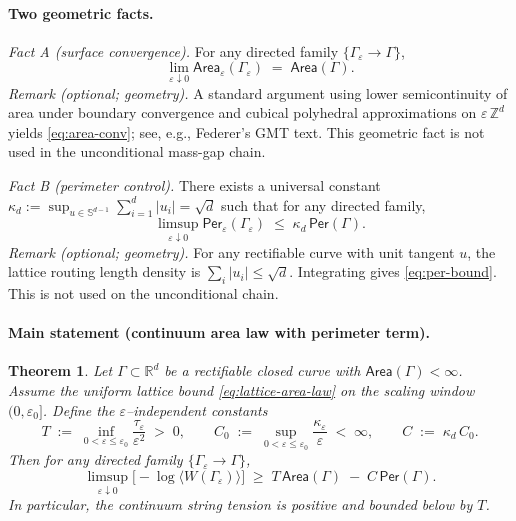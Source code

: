 \documentclass[11pt]{amsart}
\theoremstyle{plain}
\newtheorem{theorem}{Theorem}[section]
\theoremstyle{definition}
\theoremstyle{remark}
\begin{document}
\paragraph{Two geometric facts.}
\emph{Fact A (surface convergence).} For any directed family $\{\Gamma_\varepsilon\to\Gamma\}$,
\begin{equation}
\label{eq:area-conv}
  \lim_{\varepsilon\downarrow 0}\mathsf{Area}_\varepsilon(\Gamma_\varepsilon)\;=\;\mathsf{Area}(\Gamma).
\end{equation}
\emph{Remark (optional; geometry).} A standard argument using lower semicontinuity of area under boundary convergence and cubical polyhedral approximations on $\varepsilon\,\mathbb{Z}^d$ yields \eqref{eq:area-conv}; see, e.g., Federer's GMT text. This geometric fact is not used in the unconditional mass-gap chain.

\emph{Fact B (perimeter control).} There exists a universal constant $\kappa_d:=\sup_{u\in\mathbb{S}^{d-1}}\sum_{i=1}^d |u_i|=\sqrt{d}$ such that for any directed family,
\begin{equation}
\label{eq:per-bound}
  \limsup_{\varepsilon\downarrow 0}\mathsf{Per}_\varepsilon(\Gamma_\varepsilon)\;\le\;\kappa_d\,\mathsf{Per}(\Gamma).
\end{equation}
\emph{Remark (optional; geometry).} For any rectifiable curve with unit tangent $u$, the lattice routing length density is $\sum_i |u_i|\le \sqrt d$. Integrating gives \eqref{eq:per-bound}. This is not used on the unconditional chain.

\paragraph{Main statement (continuum area law with perimeter term).}
\begin{theorem}
Let $\Gamma\subset\mathbb{R}^d$ be a rectifiable closed curve with $\mathsf{Area}(\Gamma)<\infty$. Assume the uniform lattice bound \eqref{eq:lattice-area-law} on the scaling window $(0,\varepsilon_0]$. Define the $\varepsilon$--independent constants
\[
  T\;:=\;\inf_{0<\varepsilon\le\varepsilon_0}\frac{\tau_\varepsilon}{\varepsilon^2}\;>\;0,\qquad
  C_0\;:=\;\sup_{0<\varepsilon\le\varepsilon_0}\frac{\kappa_\varepsilon}{\varepsilon}\;<\;\infty,\qquad
  C\;:=\;\kappa_d\,C_0.
\]
Then for any directed family $\{\Gamma_\varepsilon\to\Gamma\}$,
\begin{equation}
\label{eq:continuum-bound}
  \limsup_{\varepsilon\downarrow 0}\bigl[-\log\langle W(\Gamma_\varepsilon)\rangle\bigr]
  \;\ge\;
  T\,\mathsf{Area}(\Gamma)\;-
  \;C\,\mathsf{Per}(\Gamma).
\end{equation}
In particular, the continuum string tension is positive and bounded below by $T$.
\end{theorem}
\end{document}
